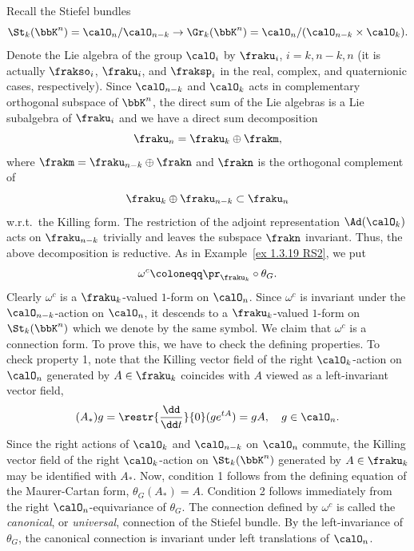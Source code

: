 \begin{example}
    Recall the Stiefel bundles
    \[\St_k(\bbK^n)=\calO_n\slash \calO_{n-k}\to \Gr_k(\bbK^n)=\calO_n\slash (\calO_{n-k}\times\calO_k).\]
    Denote the Lie algebra of the group $\calO_i$ by $\fraku_i$, $i=k,n-k,n$ (it is actually $\frakso_i$, $\fraku_i$, and $\fraksp_i$ in the real, complex, and quaternionic cases, respectively). Since $\calO_{n-k}$ and $\calO_k$ acts in complementary orthogonal subspace of $\bbK^n$, the direct sum of the Lie algebras is a Lie subalgebra of $\fraku_i$ and we have a direct sum decomposition
    \[\fraku_n=\fraku_k\oplus\frakm,\]
    where $\frakm=\fraku_{n-k}\oplus\frakn$ and $\frakn$ is the orthogonal complement of
    \[\fraku_k\oplus\fraku_{n-k}\subset \fraku_n\]
    w.r.t.\ the Killing form. The restriction of the adjoint representation $\Ad(\calO_k)$ acts on $\fraku_{n-k}$ trivially and leaves the subspace $\frakn$ invariant. Thus, the above decomposition is reductive. As in Example~\ref{ex 1.3.19 RS2}, we put
    \[\omega^c\coloneqq \pr_{\fraku_k}\circ\theta_G.\]
    Clearly $\omega^c$ is a $\fraku_k$-valued $1$-form on $\calO_n$. Since $\omega^c$ is invariant under the $\calO_{n-k}$-action on $\calO_n$, it descends to a $\fraku_k$-valued $1$-form on $\St_k(\bbK^n)$ which we denote by the same symbol. We claim that $\omega^c$ is a connection form. To prove this, we have to check the defining properties. To check property 1, note that the Killing vector field of the right $\calO_k$-action on $\calO_n$ generated by $A\in \fraku_k$ coincides with $A$ viewed as a left-invariant vector field,
    \[(A_\ast)g=\restr{\frac{\dd}{\dd t}}{0}(g e^{tA})=gA,\quad g\in\calO_n.\]
    Since the right actions of $\calO_k$ and $\calO_{n-k}$ on $\calO_n$ commute, the Killing vector field of the right $\calO_k$-action on $\St_k(\bbK^n)$ generated by $A\in\fraku_k$ may be identified with $A_\ast$. Now, condition 1 follows from the defining equation of the Maurer-Cartan form, $\theta_G(A_\ast)=A$. Condition 2 follows immediately from the right $\calO_n$-equivariance of $\theta_G$. The connection defined by $\omega^c$ is called the \emph{canonical}, or \emph{universal}, connection of the Stiefel bundle. By the left-invariance of $\theta_G$, the canonical connection is invariant under left translations of $\calO_n$.


\end{example}
